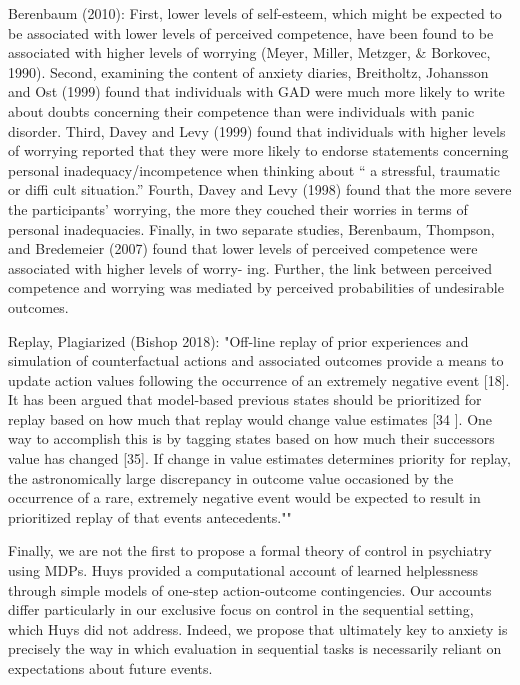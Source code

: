 \documentclass[11pt]{article} %
\begin{document}
Berenbaum (2010):
First, lower levels of self-esteem, which might be expected to be associated with lower levels of perceived competence, have been found to be associated with higher levels of worrying (Meyer, Miller, Metzger, & Borkovec, 1990). Second, examining the content of anxiety diaries, Breitholtz, Johansson and Ost (1999) found that individuals with GAD were much more likely to write about doubts concerning their competence than were individuals with panic disorder. Third, Davey and Levy (1999) found that individuals with higher levels of worrying reported that they were more likely to endorse statements concerning personal inadequacy/incompetence when thinking about “ a stressful, traumatic or diffi cult situation.” Fourth, Davey and Levy (1998) found that the more severe the participants' worrying, the more they couched their worries in terms of personal inadequacies. Finally, in two separate studies, Berenbaum, Thompson, and Bredemeier (2007) found that lower levels of perceived competence were associated with higher levels of worry- ing. Further, the link between perceived competence and worrying was mediated by perceived probabilities of undesirable outcomes.

Replay, Plagiarized (Bishop 2018):
"Off-line replay of prior experiences and simulation of counterfactual actions and associated outcomes provide a means to update action values following the occurrence of an extremely negative event [18]. It has been argued that model-based previous states should be prioritized for replay based on how much that replay would change value estimates [34 ]. One way to accomplish this is by tagging states based on how much their successors value has changed [35]. If change in value estimates determines priority for replay, the astronomically large discrepancy in outcome value occasioned by the occurrence of a rare, extremely negative event would be expected to result in prioritized replay of that events antecedents.""

Finally, we are not the first to propose a formal theory of control in psychiatry using MDPs. Huys\cite{HuysDayan2009} provided a computational account of learned helplessness through simple models of one-step action-outcome contingencies. Our accounts differ particularly in our exclusive focus on control in the sequential setting, which Huys did not address. Indeed, we propose that ultimately key to anxiety is precisely the way in which evaluation in sequential tasks is necessarily reliant on expectations about future events.


\small{}
\end{document}
